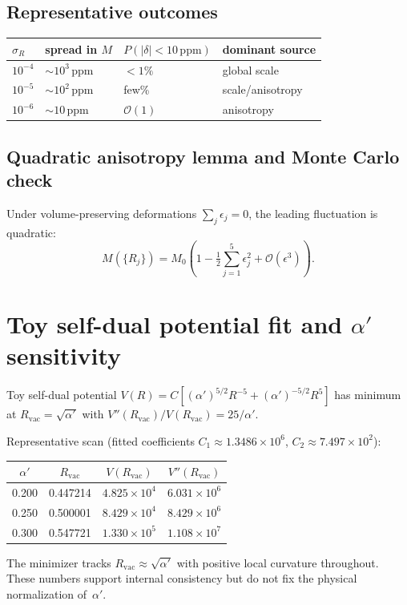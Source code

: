 \documentclass[11pt,a4paper]{article}
\begin{document}
\subsection{Representative outcomes}
\begin{center}
\renewcommand{\arraystretch}{1.2}
\begin{tabular}{llll}
\toprule
$\sigma_R$ & spread in $M$ & $P(|\delta|<10\,\mathrm{ppm})$ & dominant source\\
\midrule
$10^{-4}$ & $\sim10^3\,\mathrm{ppm}$ & $<1\%$ & global scale\\
$10^{-5}$ & $\sim10^2\,\mathrm{ppm}$ & few\% & scale/anisotropy\\
$10^{-6}$ & $\sim10\,\mathrm{ppm}$ & $\mathcal{O}(1)$ & anisotropy\\
\bottomrule
\end{tabular}
\end{center}

\subsection{Quadratic anisotropy lemma and Monte Carlo check}
Under volume-preserving deformations $\sum_j\epsilon_j=0$, the leading fluctuation is
quadratic:
\[
  M(\{R_j\}) = M_0\!\left(1-\tfrac12\textstyle\sum_{j=1}^5\epsilon_j^2
                       +\mathcal{O}(\epsilon^3)\right).
\]

\section{Toy self-dual potential fit and $\alpha'$ sensitivity}
Toy self-dual potential $V(R)=C[(\alpha')^{5/2}R^{-5}+(\alpha')^{-5/2}R^5]$
has minimum at $R_{\mathrm{vac}}=\sqrt{\alpha'}$ with
$V''(R_{\mathrm{vac}})/V(R_{\mathrm{vac}})=25/\alpha'$.

Representative scan (fitted coefficients
$C_1\approx1.3486\times10^6$, $C_2\approx7.497\times10^2$):
\begin{center}
\renewcommand{\arraystretch}{1.15}
\begin{tabular}{cccc}
\toprule
$\alpha'$ & $R_{\mathrm{vac}}$ & $V(R_{\mathrm{vac}})$ & $V''(R_{\mathrm{vac}})$\\
\midrule
0.200 & 0.447214 & $4.825\times10^4$ & $6.031\times10^6$\\
0.250 & 0.500001 & $8.429\times10^4$ & $8.429\times10^6$\\
0.300 & 0.547721 & $1.330\times10^5$ & $1.108\times10^7$\\
\bottomrule
\end{tabular}
\end{center}
The minimizer tracks $R_{\mathrm{vac}}\approx\sqrt{\alpha'}$ with positive
local curvature throughout.  These numbers support internal consistency but
do not fix the physical normalization of~$\alpha'$.
\end{document}
